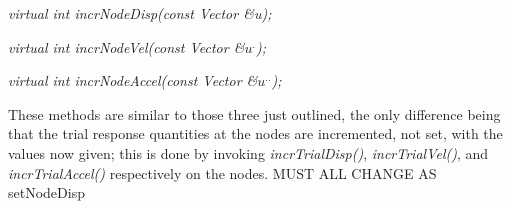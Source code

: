 {\em virtual int incrNodeDisp(const Vector \&u);} 

{\em virtual int incrNodeVel(const Vector \&$u^{.}$);}

{\em virtual int incrNodeAccel(const Vector \&$u^{..}$);}

These methods are similar to those three just outlined, the only
difference being that the trial response quantities at the nodes are
incremented, not set, with the values now given; this is done by
invoking {\em incrTrialDisp()}, {\em incrTrialVel()}, and {\em 
incrTrialAccel()} respectively on the nodes. MUST ALL CHANGE AS
setNodeDisp \\ 






